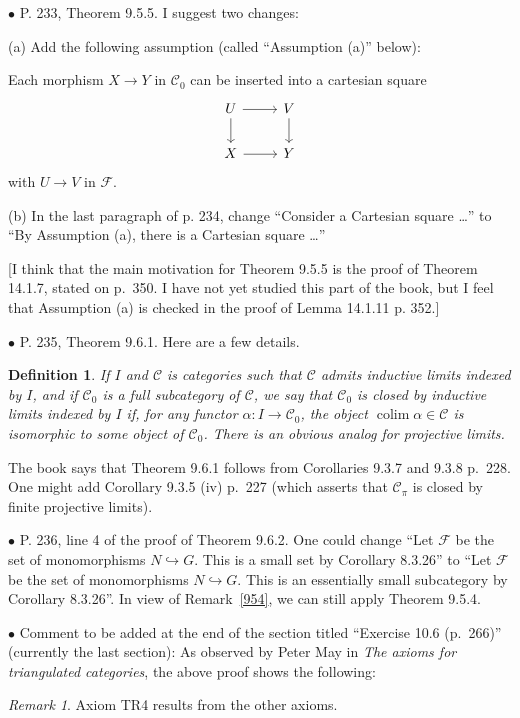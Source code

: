 \documentclass[12pt]{article}
\newtheorem{df}[thm]{Definition}
\theoremstyle{remark}
\newtheorem{rk}[thm]{Remark}
\newcommand{\bu}{\bullet}
\newcommand{\n}{\noindent}
\newcommand{\cc}{\mathcal}
\newcommand{\C}{\mathcal C}
\newcommand{\incl}{\hookrightarrow}
\DeclareMathOperator*{\co}{colim}
\begin{document}

\n$\bu$ P. 233, Theorem 9.5.5. I suggest two changes: 

\n(a) Add the following assumption (called ``Assumption (a)'' below): 

Each morphism $X\to Y$ in $\C_0$ can be inserted into a cartesian square
$$
\begin{tikzcd}
U\ar{r}\ar{d}&V\ar{d}\\ X\ar{r}&Y
\end{tikzcd}
$$ 
with $U\to V$ in $\cc F$. 

\n(b) In the last paragraph of p. 234, change ``Consider a Cartesian square \dots'' to ``By Assumption (a), there is a Cartesian square \dots'' 

[I think that the main motivation for Theorem 9.5.5 is the proof of Theorem 14.1.7, stated on p.~350. I have not yet studied this part of the book, but I feel that Assumption (a) is checked in the proof of Lemma 14.1.11 p. 352.] 


\n$\bu$ P. 235, Theorem 9.6.1. Here are a few details. 
%
\begin{df}\label{cb}
If $I$ and $\C$ is categories such that $\C$ admits inductive limits indexed by $I$, and if $\C_0$ is a full subcategory of $\C$, we say that $\C_0$ is {\em closed by inductive limits indexed by} $I$ if, for any functor $\alpha:I\to\C_0$, the object $\co\alpha\in\C$ is isomorphic to some object of $\C_0$. There is an obvious analog for projective limits.
\end{df}

The book says that Theorem 9.6.1 follows from Corollaries 9.3.7 and 9.3.8 p.~228. One might add Corollary 9.3.5 (iv) p.~227 (which asserts that $\C_\pi$ is closed by finite projective limits). 


\n$\bu$ P. 236, line 4 of the proof of Theorem 9.6.2. One could change ``Let $\cc F$ be the set of monomorphisms $N\incl G$. This is a small set by Corollary 8.3.26'' to ``Let $\cc F$ be the set of monomorphisms $N\incl G$. This is an essentially small subcategory by Corollary 8.3.26''. In view of Remark~\ref{954}, we can still apply Theorem 9.5.4. 


\n$\bu$ Comment to be added at the end of the section titled ``Exercise 10.6 (p.~266)'' (currently the last section): As observed by Peter May in {\em The axioms for triangulated categories}, the above proof shows the following:
\begin{rk}\label{may}
Axiom TR4 results from the other axioms.
\end{rk}
\end{document}
